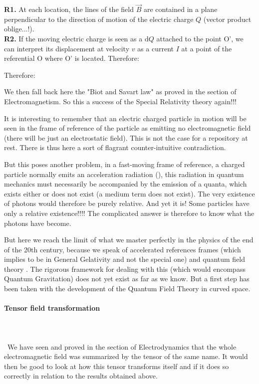 	\begin{tcolorbox}[title=Remarks,colframe=black,arc=10pt]
	\textbf{R1.} At each location, the lines of the field $\vec{B}$ are contained in a plane perpendicular to the direction of motion of the electric charge $Q$ (vector product oblige...!).\\
	
	\textbf{R2.} If the moving electric charge is seen as a $\mathrm{d}Q$ attached to the point O', we can interpret its displacement at velocity $v$ as a current $I$ at a point of the referential O where O' is located. Therefore:
	
	Therefore:
	
	We then fall back here the "Biot and Savart law" as proved in the section of Electromagnetism. So this a success of the Special Relativity theory again!!!
	\end{tcolorbox}
	It is interesting to remember that an electric charged particle in motion will be seen in the frame of reference of the particle as emitting no electromagnetic field (there will be just an electrostatic field). This is not the case for a repository at rest. There is thus here a sort of flagrant counter-intuitive contradiction.

	But this poses another problem, in a fast-moving frame of reference, a charged particle normally emits an acceleration radiation (), this radiation in quantum mechanics must necessarily be accompanied by the emission of a quanta, which exists either or does not exist (a medium term does not exist). The very existence of photons would therefore be purely relative. And yet it is! Some particles have only a relative existence!!!! The complicated answer is therefore to know what the photons have become.

	But here we reach the limit of what we master perfectly in the physics of the end of the 20th century, because we speak of accelerated references frames (which implies to be in General Gelativity and not the special one) and quantum field theory . The rigorous framework for dealing with this (which would encompass Quantum Gravitation) does not yet exist as far as we know. But a first step has been taken with the development of the Quantum Field Theory in curved space.
	
	\pagebreak
	\paragraph{Tensor field transformation}\mbox{}\\\\\
	We have seen and proved in the section of Electrodynamics that the whole electromagnetic field was summarized by the tensor of the same name. It would then be good to look at how this tensor transforms itself and if it does so correctly in relation to the results obtained above.

